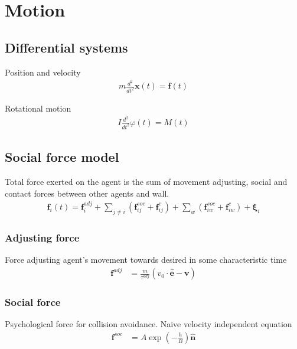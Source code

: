 \section{Motion}
\subsection{Differential systems}
Position and velocity
\begin{align}
m \frac{d^{2}}{d t^{2}} \mathbf{x}(t) = \mathbf{f}(t)
\end{align}

Rotational motion
\begin{align}
I \frac{d^{2}}{d t^{2}} \varphi(t) = M(t)
\end{align}

\subsection{Social force model}
Total force exerted on the agent is the sum of movement adjusting, social and contact forces between other agents and wall.
\begin{align}
\mathbf{f}_{i}(t) = \mathbf{f}_{i}^{adj} + \sum_{j\neq i}^{} \left(\mathbf{f}_{ij}^{soc} + \mathbf{f}_{ij}^{c}\right) + \sum_{w}^{} \left(\mathbf{f}_{iw}^{soc} + \mathbf{f}_{iw}^{c}\right) + \boldsymbol{\xi}_{i}
\end{align}


\subsubsection{Adjusting force}
Force adjusting agent's movement towards desired in some characteristic time \begin{align}
\mathbf{f}^{adj} &= \frac{m}{\tau^{adj}} (v_{0} \cdot \hat{\mathbf{e}} - \mathbf{v}) 
\end{align}


\subsubsection{Social force}
Psychological force for collision avoidance. Naive velocity independent equation
\begin{align}
\mathbf{f}^{soc} &= A \exp\left(-\frac{h}{B}\right) \hat{\mathbf{n}}
\end{align}

